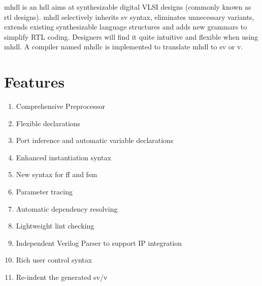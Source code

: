 \gls{mhdl} is an \gls{hdl} aims at synthesizable digital VLSI designs (commonly 
known as \gls{rtl} designs). \gls{mhdl} selectively inherits \gls{sv}
syntax, eliminates unnecessary variants, extends existing
synthesizable language structures and adds new grammars to simplify
RTL coding. Designers will find it quite intuitive and flexible when
using \gls{mhdl}. A compiler named \gls{mhdlc} is
implemented to translate \gls{mhdl} to \gls{sv} or \gls{v}.  

\section{Features}
\begin{enumerate}
\item Comprehensive Preprocessor
\item Flexible declarations
\item Port inference and automatic variable declarations
\item Enhanced instantiation syntax
\item New syntax for \gls{ff} and \gls{fsm}
\item Parameter tracing
\item Automatic dependency resolving
\item Lightweight lint checking
\item Independent Verilog Parser to support IP integration
\item Rich user control syntax
\item Re-indent the generated \gls{sv}/\gls{v}
\end{enumerate}

